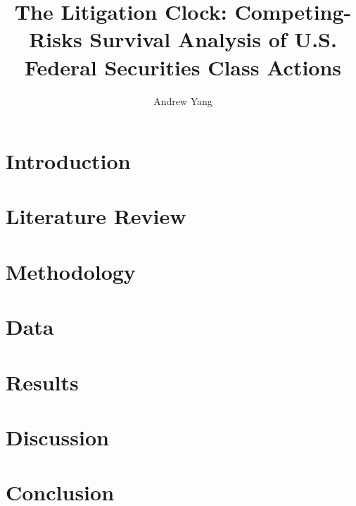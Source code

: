 \documentclass[12pt,lot,lof]{puthesis_undergraduate}
\title{The Litigation Clock: Competing-Risks Survival Analysis of U.S. Federal Securities Class Actions}
\author{Andrew Yang}
\begin{document}
\chapter{Introduction}\label{ch:intro}


\chapter{Literature Review}\label{ch:litreview}


\chapter{Methodology}\label{ch:methodology}


\chapter{Data}\label{ch:data}


\chapter{Results}\label{ch:results}


\chapter{Discussion}\label{ch:discussion}


\chapter{Conclusion}\label{ch:conclusion}




\end{document}
